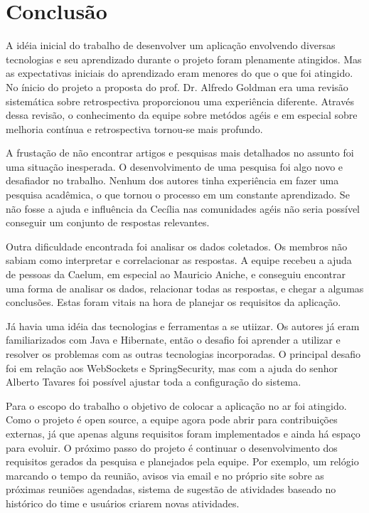 \section{Conclusão}

A idéia inicial do trabalho de desenvolver um aplicação envolvendo diversas tecnologias e seu aprendizado durante o projeto foram plenamente atingidos. Mas as expectativas iniciais do aprendizado eram menores do que o que foi atingido.
No ínicio do projeto a proposta do prof. Dr. Alfredo Goldman era uma revisão sistemática sobre retrospectiva proporcionou uma experiência diferente. Através dessa revisão, o conhecimento da equipe sobre metódos agéis e em especial sobre melhoria contínua e retrospectiva tornou-se mais profundo.

A frustação de não encontrar artigos e pesquisas mais detalhados no assunto foi uma situação inesperada. O desenvolvimento de uma pesquisa foi algo novo e desafiador no trabalho. Nenhum dos autores tinha experiência em fazer uma pesquisa acadêmica, o que tornou o processo em um constante aprendizado. Se não fosse a ajuda e influência da Cecília nas comunidades agéis não seria possível conseguir um conjunto de respostas relevantes.

Outra dificuldade encontrada foi analisar os dados coletados. Os membros não sabiam como interpretar e correlacionar as respostas. A equipe recebeu a ajuda de pessoas da Caelum, em especial ao Mauricio Aniche, e conseguiu encontrar uma forma de analisar os dados, relacionar todas as respostas, e chegar a algumas conclusões. Estas foram vitais na hora de planejar os requisitos da aplicação.

Já havia uma idéia das tecnologias e ferramentas a se utiizar. Os autores já eram familiarizados com Java e Hibernate, então o desafio foi aprender a utilizar e resolver os problemas com as outras tecnologias incorporadas. O principal desafio foi em relação aos WebSockets e SpringSecurity, mas com a ajuda do senhor Alberto Tavares foi possível ajustar toda a configuração do sistema. 

Para o escopo do trabalho o objetivo de colocar a aplicação no ar foi atingido. Como o projeto é open source, a equipe agora pode abrir para contribuições externas, já que apenas alguns requisitos foram implementados e ainda há espaço para evoluir.  
O próximo passo do projeto é continuar o desenvolvimento dos requisitos gerados da pesquisa e planejados pela equipe. Por exemplo, um relógio marcando o tempo da reunião, avisos via email e no próprio site sobre as próximas reuniões agendadas, sistema de sugestão de atividades baseado no histórico do time e  usuários criarem novas atividades.

